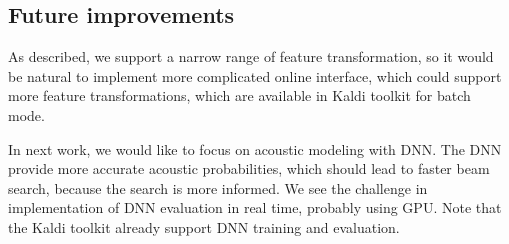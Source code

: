 
\subsection{Future improvements}
\label{sub:onl_future}
As described, we support a narrow range of feature transformation,
so it would be natural to implement more complicated online interface,
which could support more feature transformations, 
which are available in Kaldi toolkit for batch mode. 

In next work, we would like to focus on acoustic modeling with \acl{DNN}.
The \ac{DNN} provide more accurate acoustic probabilities, 
which should lead to faster beam search,
because the search is more informed.\cite{TODO_DNN} 
We see the challenge in implementation of \acl{DNN} evaluation in real time, probably using \ac{GPU}.
Note that the Kaldi toolkit already support \ac{DNN} training and evaluation.
